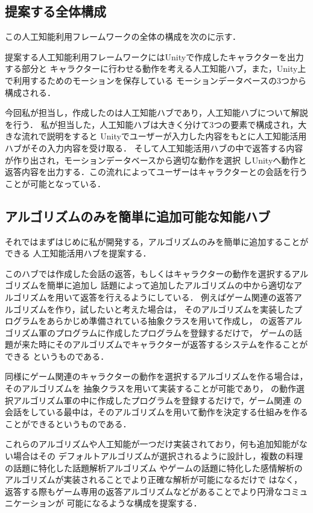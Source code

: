\subsection{提案する全体構成}\label{sec:allAr}
この人工知能利用フレームワークの全体の構成を次のに示す．


提案する人工知能利用フレームワークにはUnityで作成したキャラクターを出力する部分と
キャラクターに行わせる動作を考える人工知能ハブ，また，Unity上で利用するためのモーションを保存している
モーションデータベースの3つから構成される．

今回私が担当し，作成したのは人工知能ハブであり，人工知能ハブについて解説を行う．
私が担当した，人工知能ハブは大きく分けて3つの要素で構成され，大きな流れで説明をすると
Unityでユーザーが入力した内容をもとに人工知能活用ハブがその入力内容を受け取る．
そして人工知能活用ハブの中で返答する内容が作り出され，モーションデータベースから適切な動作を選択
しUnityへ動作と返答内容を出力する．この流れによってユーザーはキャラクターとの会話を行うことが可能となっている．

\subsection{アルゴリズムのみを簡単に追加可能な知能ハブ}
それではまずはじめに私が開発する，アルゴリズムのみを簡単に追加することができる
人工知能活用ハブを提案する．

このハブでは作成した会話の返答，もしくはキャラクターの動作を選択するアルゴリズムを簡単に追加し
話題によって追加したアルゴリズムの中から適切なアルゴリズムを用いて返答を行えるようにしている．
例えばゲーム関連の返答アルゴリズムを作り，試したいと考えた場合は，
そのアルゴリズムを実装したプログラムをあらかじめ準備されている抽象クラスを用いて作成し，
の返答アルゴリズム軍のプログラムに作成したプログラムを登録するだけで，
ゲームの話題が来た時にそのアルゴリズムでキャラクターが返答するシステムを作ることができる
というものである．

同様にゲーム関連のキャラクターの動作を選択するアルゴリズムを作る場合は，そのアルゴリズムを
抽象クラスを用いて実装することが可能であり，
の動作選択アルゴリズム軍の中に作成したプログラムを登録するだけで，ゲーム関連
の会話をしている最中は，そのアルゴリズムを用いて動作を決定する仕組みを作ることができるというものである．

これらのアルゴリズムや人工知能が一つだけ実装されており，何も追加知能がない場合はその
デフォルトアルゴリズムが選択されるように設計し，複数の料理の話題に特化した話題解析アルゴリズム
やゲームの話題に特化した感情解析のアルゴリズムが実装されることでより正確な解析が可能になるだけで
はなく，返答する際もゲーム専用の返答アルゴリズムなどがあることでより円滑なコミュニケーションが
可能になるような構成を提案する．

